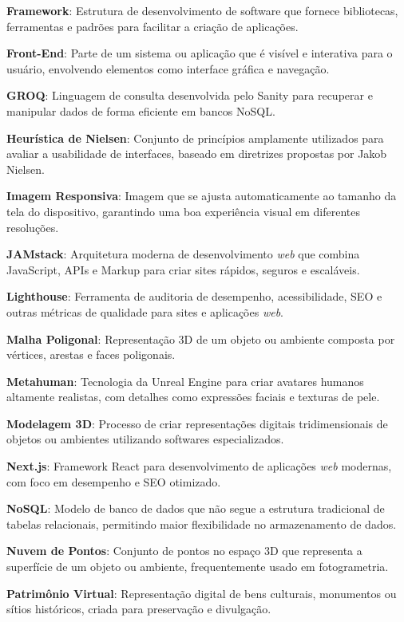 \textbf{Framework}: Estrutura de desenvolvimento de software que fornece bibliotecas, ferramentas e padrões para facilitar a criação de aplicações.

\textbf{Front-End}: Parte de um sistema ou aplicação que é visível e interativa para o usuário, envolvendo elementos como interface gráfica e navegação.

\textbf{GROQ}: Linguagem de consulta desenvolvida pelo Sanity para recuperar e manipular dados de forma eficiente em bancos NoSQL.

\textbf{Heurística de Nielsen}: Conjunto de princípios amplamente utilizados para avaliar a usabilidade de interfaces, baseado em diretrizes propostas por Jakob Nielsen.

\textbf{Imagem Responsiva}: Imagem que se ajusta automaticamente ao tamanho da tela do dispositivo, garantindo uma boa experiência visual em diferentes resoluções.

\textbf{JAMstack}: Arquitetura moderna de desenvolvimento \textit{web} que combina JavaScript, APIs e Markup para criar sites rápidos, seguros e escaláveis.

\textbf{Lighthouse}: Ferramenta de auditoria de desempenho, acessibilidade, SEO e outras métricas de qualidade para sites e aplicações \textit{web}.

\textbf{Malha Poligonal}: Representação 3D de um objeto ou ambiente composta por vértices, arestas e faces poligonais.

\textbf{Metahuman}: Tecnologia da Unreal Engine para criar avatares humanos altamente realistas, com detalhes como expressões faciais e texturas de pele.

\textbf{Modelagem 3D}: Processo de criar representações digitais tridimensionais de objetos ou ambientes utilizando softwares especializados.

\textbf{Next.js}: Framework React para desenvolvimento de aplicações \textit{web} modernas, com foco em desempenho e SEO otimizado.

\textbf{NoSQL}: Modelo de banco de dados que não segue a estrutura tradicional de tabelas relacionais, permitindo maior flexibilidade no armazenamento de dados.

\textbf{Nuvem de Pontos}: Conjunto de pontos no espaço 3D que representa a superfície de um objeto ou ambiente, frequentemente usado em fotogrametria.

\textbf{Patrimônio Virtual}: Representação digital de bens culturais, monumentos ou sítios históricos, criada para preservação e divulgação.

